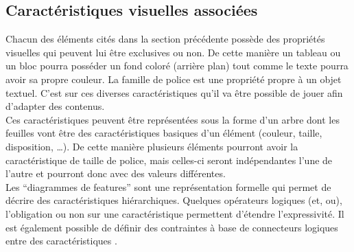 \documentclass[french,a4paper]{report}
\begin{document}
{\subsection{Caractéristiques visuelles associées}
Chacun des éléments cités dans la section précédente possède des
propriétés visuelles qui peuvent lui être exclusives ou non. De cette
manière un tableau ou un bloc pourra posséder un fond coloré (arrière
plan) tout comme le texte pourra avoir sa propre couleur. La famille
de police est une propriété propre à un objet textuel. C'est sur ces
diverses caractéristiques qu'il va être possible de jouer afin d'adapter
des contenus.\\
Ces caractéristiques peuvent être représentées sous la forme d'un
arbre dont les feuilles vont être des caractéristiques basiques d'un
élément (couleur, taille, disposition, \dots). De cette manière plusieurs
éléments pourront avoir la caractéristique de taille de police, mais celles-ci
seront indépendantes l'une de l'autre et pourront donc avec des valeurs
différentes.\\
Les ``diagrammes de features'' sont une représentation formelle qui permet
de décrire des caractéristiques hiérarchiques. Quelques opérateurs
logiques (et, ou), l'obligation ou non sur une caractéristique
permettent d'étendre l'expressivité. Il est également possible de
définir des contraintes à base de connecteurs logiques entre des
caractéristiques \cite{FeaDiag}.
\begin{figure}[H]
\centering
\end{figure}}
\end{document}
